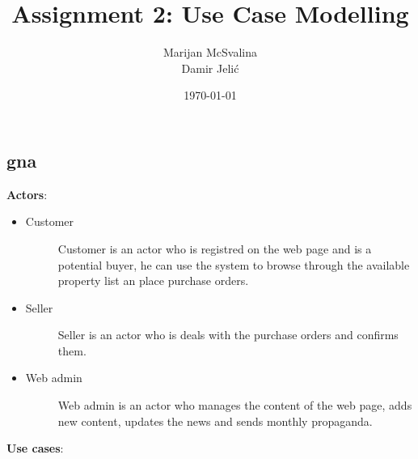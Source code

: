 \documentclass[12pt, titlepage]{article}
\title{Assignment 2: Use Case Modelling}
\date{\today}
\author{Marijan McSvalina \\ Damir Jelić}
\begin{document}
\maketitle 

\setcounter{section}{2}
\subsection{gna}
{\bf Actors}:
\begin{itemize}
\item
    Customer
    \begin{description}
    \item[]Customer is an actor who is registred on the web page and is a potential buyer, he can use the system to browse
    through the available property list an place purchase orders. 
    \end{description}
\item
    Seller
    \begin{description}
    \item[]Seller is an actor who is deals with the purchase orders and confirms them.
    \end{description}
\item
    Web admin
    \begin{description}
    \item[]Web admin is an actor who manages the content of the web page, adds new content, updates the news and sends monthly propaganda.
    \end{description}
\end{itemize}
{\bf Use cases}:
\end{document}
